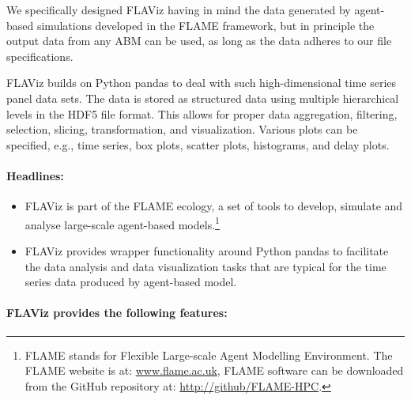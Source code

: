 \documentclass[10pt,a4paper]{article}
\begin{document}
We specifically designed FLAViz having in mind the data generated by agent-based simulations developed in the FLAME framework, but in principle the output data from any ABM can be used, as long as the data adheres to our file specifications.

FLAViz builds on Python pandas to deal with such high-dimensional time series panel data sets.
The data is stored as structured data using multiple hierarchical levels in the HDF5 file format.
This allows for proper data aggregation, filtering, selection, slicing, transformation, and visualization.
Various plots can be specified, e.g., time series, box plots, scatter plots, histograms, and delay plots. 

\paragraph{Headlines:}

\begin{itemize}
\item FLAViz is part of the FLAME ecology, a set of tools to develop, simulate and analyse large-scale agent-based models.\footnote{FLAME stands for Flexible Large-scale Agent Modelling Environment. The FLAME website is at: \href{www.flame.ac.uk}{www.flame.ac.uk}, FLAME software can be downloaded from the GitHub repository at: \href{http://github/FLAME-HPC}{http://github/FLAME-HPC}.}

\item FLAViz provides wrapper functionality around Python pandas to facilitate the data analysis and data visualization tasks that are typical for the time series data produced by agent-based model.
\end{itemize}


\paragraph{FLAViz provides the following features:}
\end{document}

